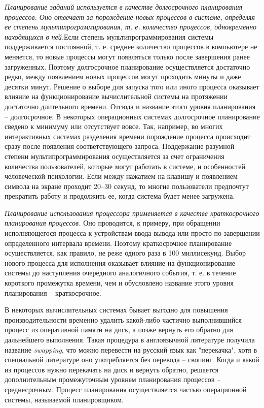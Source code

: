 \textit{Планирование заданий используется в качестве долгосрочного планирования процессов. Оно отвечает за порождение новых процессов в системе, определяя ее степень мультипрограммирования, т. е. количество процессов, одновременно находящихся в ней.}Если степень мультипрограммирования системы поддерживается постоянной, т. е. среднее количество процессов в компьютере не меняется, то новые процессы могут появляться только после завершения ранее загруженных. Поэтому долгосрочное планирование осуществляется достаточно редко, между появлением новых процессов могут проходить минуты и даже десятки минут. Решение о выборе для запуска того или иного процесса оказывает влияние на функционирование вычислительной системы на протяжении достаточно длительного времени. Отсюда и название этого уровня планирования – долгосрочное. В некоторых операционных системах долгосрочное планирование сведено к минимуму или отсутствует вовсе. Так, например, во многих интерактивных системах разделения времени порождение процесса происходит сразу после появления соответствующего запроса. Поддержание разумной степени мультипрограммирования осуществляется за счет ограничения количества пользователей, которые могут работать в системе, и особенностей человеческой психологии. Если между нажатием на клавишу и появлением символа на экране проходит 20–30 секунд, то многие пользователи предпочтут прекратить работу и продолжить ее, когда система будет менее загружена.

\textit{Планирование использования процессора применяется в качестве краткосрочного планирования процессов.} Оно проводится, к примеру, при обращении исполняющегося процесса к устройствам ввода-вывода или просто по завершении определенного интервала времени. Поэтому краткосрочное планирование осуществляется, как правило, не реже одного раза в 100 миллисекунд. Выбор нового процесса для исполнения оказывает влияние на функционирование системы до наступления очередного аналогичного события, т. е. в течение короткого промежутка времени, чем и обусловлено название этого уровня планирования – краткосрочное.

В некоторых вычислительных системах бывает выгодно для повышения производительности временно удалить какой-либо частично выполнившийся процесс из оперативной памяти на диск, а позже вернуть его обратно для дальнейшего выполнения. Такая процедура в англоязычной литературе получила название \textit{swapping}, что можно перевести на русский язык как "перекачка", хотя в специальной литературе оно употребляется без перевода – свопинг. Когда и какой из процессов нужно перекачать на диск и вернуть обратно, решается дополнительным промежуточным уровнем планирования процессов – среднесрочным.
Процесс планирования осуществляется частью операционной системы, называемой планировщиком.

